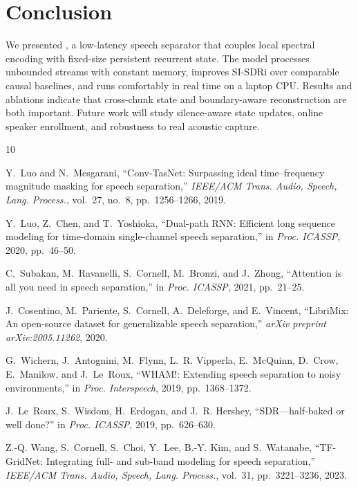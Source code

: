 \section{Conclusion}

We presented \model, a low-latency speech separator that couples local spectral
encoding with fixed-size persistent recurrent state.  The model processes
unbounded streams with constant memory, improves SI-SDRi over comparable causal
baselines, and runs comfortably in real time on a laptop CPU.  Results and
ablations indicate that cross-chunk state and boundary-aware reconstruction are
both important.  Future work will study silence-aware state updates, online
speaker enrollment, and robustness to real acoustic capture.

\begin{thebibliography}{10}
\small

Y.~Luo and N.~Mesgarani, ``Conv-TasNet: Surpassing ideal time--frequency
magnitude masking for speech separation,'' \emph{IEEE/ACM Trans. Audio, Speech,
Lang. Process.}, vol.~27, no.~8, pp.~1256--1266, 2019.

Y.~Luo, Z.~Chen, and T.~Yoshioka, ``Dual-path RNN: Efficient long sequence
modeling for time-domain single-channel speech separation,'' in \emph{Proc.
ICASSP}, 2020, pp.~46--50.

C.~Subakan, M.~Ravanelli, S.~Cornell, M.~Bronzi, and J.~Zhong, ``Attention is all
you need in speech separation,'' in \emph{Proc. ICASSP}, 2021, pp.~21--25.

J.~Cosentino, M.~Pariente, S.~Cornell, A.~Deleforge, and E.~Vincent,
``LibriMix: An open-source dataset for generalizable speech separation,''
\emph{arXiv preprint arXiv:2005.11262}, 2020.

G.~Wichern, J.~Antognini, M.~Flynn, L.~R. Vipperla, E.~McQuinn, D.~Crow,
E.~Manilow, and J.~Le~Roux, ``WHAM!: Extending speech separation to noisy
environments,'' in \emph{Proc. Interspeech}, 2019, pp.~1368--1372.

J.~Le~Roux, S.~Wisdom, H.~Erdogan, and J.~R. Hershey, ``SDR---half-baked or well
done?'' in \emph{Proc. ICASSP}, 2019, pp.~626--630.

Z.-Q. Wang, S.~Cornell, S.~Choi, Y.~Lee, B.-Y. Kim, and S.~Watanabe,
``TF-GridNet: Integrating full- and sub-band modeling for speech separation,''
\emph{IEEE/ACM Trans. Audio, Speech, Lang. Process.}, vol.~31,
pp.~3221--3236, 2023.

\end{thebibliography}
